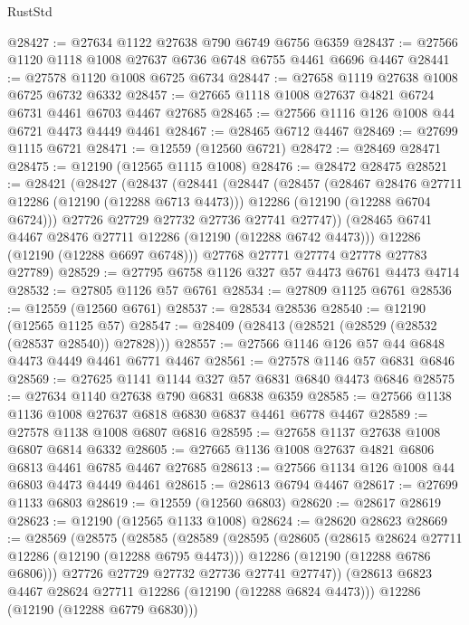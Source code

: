 \begin{lexlean}{RustStd}
\begin{coremodule}
@28427 := @27634 @1122 @27638 @790 @6749 @6756 @6359
@28437 := @27566 @1120 @1118 @1008 @27637 @6736 @6748 @6755 @4461 @6696 @4467
@28441 := @27578 @1120 @1008 @6725 @6734
@28447 := @27658 @1119 @27638 @1008 @6725 @6732 @6332
@28457 := @27665 @1118 @1008 @27637 @4821 @6724 @6731 @4461 @6703 @4467 @27685
@28465 := @27566 @1116 @126 @1008 @44 @6721 @4473 @4449 @4461
@28467 := @28465 @6712 @4467
@28469 := @27699 @1115 @6721
@28471 := @12559 (@12560 @6721)
@28472 := @28469 @28471
@28475 := @12190 (@12565 @1115 @1008)
@28476 := @28472 @28475
@28521 := @28421
    (@28427
      (@28437
        (@28441
          (@28447
            (@28457
              (@28467 @28476 @27711 @12286 (@12190 (@12288 @6713 @4473)))
              @12286
              (@12190 (@12288 @6704 @6724)))
            @27726
            @27729
            @27732
            @27736
            @27741
            @27747))
        (@28465 @6741 @4467 @28476 @27711 @12286 (@12190 (@12288 @6742 @4473)))
        @12286
        (@12190 (@12288 @6697 @6748)))
      @27768
      @27771
      @27774
      @27778
      @27783
      @27789)
@28529 := @27795 @6758 @1126 @327 @57 @4473 @6761 @4473 @4714
@28532 := @27805 @1126 @57 @6761
@28534 := @27809 @1125 @6761
@28536 := @12559 (@12560 @6761)
@28537 := @28534 @28536
@28540 := @12190 (@12565 @1125 @57)
@28547 := @28409 (@28413 (@28521 (@28529 (@28532 (@28537 @28540)) @27828)))
@28557 := @27566 @1146 @126 @57 @44 @6848 @4473 @4449 @4461 @6771 @4467
@28561 := @27578 @1146 @57 @6831 @6846
@28569 := @27625 @1141 @1144 @327 @57 @6831 @6840 @4473 @6846
@28575 := @27634 @1140 @27638 @790 @6831 @6838 @6359
@28585 := @27566 @1138 @1136 @1008 @27637 @6818 @6830 @6837 @4461 @6778 @4467
@28589 := @27578 @1138 @1008 @6807 @6816
@28595 := @27658 @1137 @27638 @1008 @6807 @6814 @6332
@28605 := @27665 @1136 @1008 @27637 @4821 @6806 @6813 @4461 @6785 @4467 @27685
@28613 := @27566 @1134 @126 @1008 @44 @6803 @4473 @4449 @4461
@28615 := @28613 @6794 @4467
@28617 := @27699 @1133 @6803
@28619 := @12559 (@12560 @6803)
@28620 := @28617 @28619
@28623 := @12190 (@12565 @1133 @1008)
@28624 := @28620 @28623
@28669 := @28569
    (@28575
      (@28585
        (@28589
          (@28595
            (@28605
              (@28615 @28624 @27711 @12286 (@12190 (@12288 @6795 @4473)))
              @12286
              (@12190 (@12288 @6786 @6806)))
            @27726
            @27729
            @27732
            @27736
            @27741
            @27747))
        (@28613 @6823 @4467 @28624 @27711 @12286 (@12190 (@12288 @6824 @4473)))
        @12286
        (@12190 (@12288 @6779 @6830)))

\end{coremodule}
\end{lexlean}
